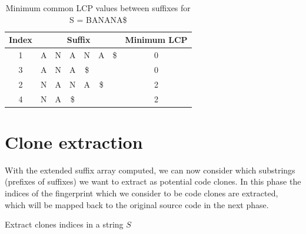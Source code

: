 \begin{table}
    \begin{center}
        \begin{tabular}[c]{c|cccccc|c}
            Index & \multicolumn{6}{c}{Suffix} & Minimum LCP \\
            \hline
            1 & A & N & A & N & A & \$ & 0 \\ 
            3 & A & N & A & \$ &  &  & 0\\ 
            2 & N & A & N & A & \$ & & 2 \\ 
            4 & N & A & \$ & & &  & 2\\ 

        \end{tabular}
    \end{center}
    \caption{Minimum common LCP values between suffixes for S = BANANA\$}
    \label{tab:}
\end{table}



\section{Clone extraction}

With the extended suffix array computed, we can now consider which substrings (prefixes of
suffixes) we want to extract as potential code clones. In this phase the indices of the
fingerprint which we consider to be code clones are extracted, which will be mapped back
to the original source code in the next phase.

\begin{algorithm}[t]
  \SetAlgoLined\DontPrintSemicolon

  \vspace{0.5cm}
  \caption{Extract clones indices in a string $S$}
  \label{alg:simplecloneextraction}
\end{algorithm}

